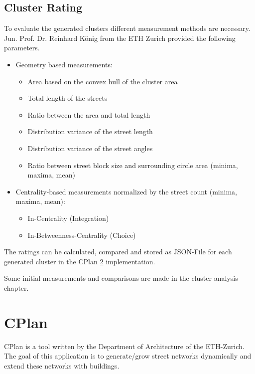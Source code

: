 \documentclass[11pt, a4paper]{report}
\begin{document}
\section{Cluster Rating}
\label{clusterRating}
To evaluate the generated clusters different measurement methods are necessary. Jun. Prof. Dr.  Reinhard König from the ETH Zurich provided the following parameters.
\newline
\begin{itemize}
    \item Geometry based measurements:
    \begin{itemize}
        \item Area based on the convex hull of the cluster area
        \item Total length of the streets
        \item Ratio between the area and total length
        \item Distribution variance of the street length
        \item Distribution variance of the street angles
        \item Ratio between street block size and surrounding circle area (minima, maxima, mean)
    \end{itemize}
    \item Centrality-based measurements normalized by the street count (minima, maxima, mean):
    \begin{itemize}
        \item In-Centrality (Integration)
        \item In-Betweenness-Centrality (Choice)
    \end{itemize}
\end{itemize}
The ratings can be calculated, compared and stored as JSON-File for each generated cluster in the CPlan \ref{CPlan} implementation.

Some initial measurements and comparisons are made in the cluster analysis chapter.


\pagebreak
\chapter{CPlan}\label{CPlan}
CPlan is a tool written by the Department of Architecture of the ETH-Zurich. The goal of this application is to generate/grow street networks dynamically and extend these networks with buildings. 
\end{document}
